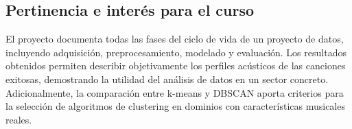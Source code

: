 \subsection{Pertinencia e interés para el curso}

El proyecto documenta todas las fases del ciclo de vida de un proyecto de datos, incluyendo adquisición, preprocesamiento, modelado y evaluación. Los resultados obtenidos permiten describir objetivamente los perfiles acústicos de las canciones exitosas, demostrando la utilidad del análisis de datos en un sector concreto. Adicionalmente, la comparación entre k-means y DBSCAN aporta criterios para la selección de algoritmos de clustering en dominios con características musicales reales.